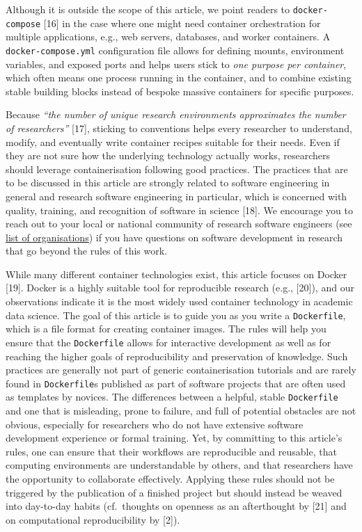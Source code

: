 \documentclass[10pt,letterpaper]{article}
\begin{document}
Although it is outside the scope of this article, we point readers to
\texttt{docker-compose} {[}16{]} in the case where one might need
container orchestration for multiple applications, e.g., web servers,
databases, and worker containers. A \texttt{docker-compose.yml}
configuration file allows for defining mounts, environment variables,
and exposed ports and helps users stick to \emph{one purpose per
container}, which often means one process running in the container, and
to combine existing stable building blocks instead of bespoke massive
containers for specific purposes.

Because \emph{``the number of unique research environments approximates
the number of researchers''} {[}17{]}, sticking to conventions helps
every researcher to understand, modify, and eventually write container
recipes suitable for their needs. Even if they are not sure how the
underlying technology actually works, researchers should leverage
containerisation following good practices. The practices that are to be
discussed in this article are strongly related to software engineering
in general and research software engineering in particular, which is
concerned with quality, training, and recognition of software in science
{[}18{]}. We encourage you to reach out to your local or national
community of research software engineers (see
\href{https://en.wikipedia.org/wiki/Research_software_engineering}{list
of organisations}) if you have questions on software development in
research that go beyond the rules of this work.

While many different container technologies exist, this article focuses
on Docker {[}19{]}. Docker is a highly suitable tool for reproducible
research (e.g., {[}20{]}), and our observations indicate it is the most
widely used container technology in academic data science. The goal of
this article is to guide you as you write a \texttt{Dockerfile}, which
is a file format for creating container images. The rules will help you
ensure that the \texttt{Dockerfile} allows for interactive development
as well as for reaching the higher goals of reproducibility and
preservation of knowledge. Such practices are generally not part of
generic containerisation tutorials and are rarely found in
\texttt{Dockerfile}s published as part of software projects that are
often used as templates by novices. The differences between a helpful,
stable \texttt{Dockerfile} and one that is misleading, prone to failure,
and full of potential obstacles are not obvious, especially for
researchers who do not have extensive software development experience or
formal training. Yet, by committing to this article's rules, one can
ensure that their workflows are reproducible and reusable, that
computing environments are understandable by others, and that
researchers have the opportunity to collaborate effectively. Applying
these rules should not be triggered by the publication of a finished
project but should instead be weaved into day-to-day habits
(cf.~thoughts on openness as an afterthought by {[}21{]} and on
computational reproducibility by {[}2{]}).
\end{document}
